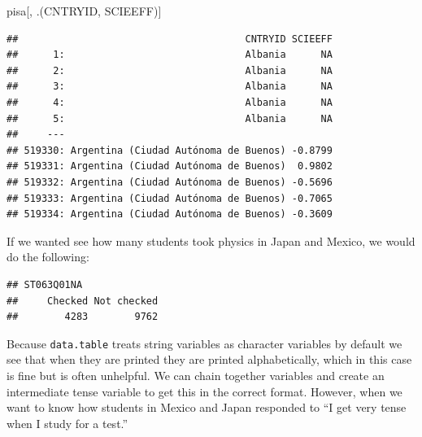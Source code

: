 \documentclass[]{book}
\newenvironment{Shaded}{\begin{snugshade}}{\end{snugshade}}
\newcommand{\KeywordTok}[1]{\textcolor[rgb]{0.13,0.29,0.53}{\textbf{#1}}}
\newcommand{\NormalTok}[1]{#1}
\newcommand{\OperatorTok}[1]{\textcolor[rgb]{0.81,0.36,0.00}{\textbf{#1}}}
\newcommand{\StringTok}[1]{\textcolor[rgb]{0.31,0.60,0.02}{#1}}
\begin{document}
\begin{Shaded}
\begin{Highlighting}[]
\NormalTok{pisa[,}
\NormalTok{     .(CNTRYID, SCIEEFF)]}
\end{Highlighting}
\end{Shaded}

\begin{verbatim}
##                                       CNTRYID SCIEEFF
##      1:                               Albania      NA
##      2:                               Albania      NA
##      3:                               Albania      NA
##      4:                               Albania      NA
##      5:                               Albania      NA
##     ---                                              
## 519330: Argentina (Ciudad Autónoma de Buenos) -0.8799
## 519331: Argentina (Ciudad Autónoma de Buenos)  0.9802
## 519332: Argentina (Ciudad Autónoma de Buenos) -0.5696
## 519333: Argentina (Ciudad Autónoma de Buenos) -0.7065
## 519334: Argentina (Ciudad Autónoma de Buenos) -0.3609
\end{verbatim}

If we wanted see how many students took physics in Japan and Mexico, we would do the following:

\begin{Shaded}
\end{Shaded}

\begin{verbatim}
## ST063Q01NA
##     Checked Not checked 
##        4283        9762
\end{verbatim}

Because \texttt{data.table} treats string variables as character variables by default we see that when they are printed they are printed alphabetically, which in this case is fine but is often unhelpful. We can chain together variables and create an intermediate tense variable to get this in the correct format. However, when we want to know how students in Mexico and Japan responded to ``I get very tense when I study for a test.''

\begin{Shaded}
\end{Shaded}
\end{document}
